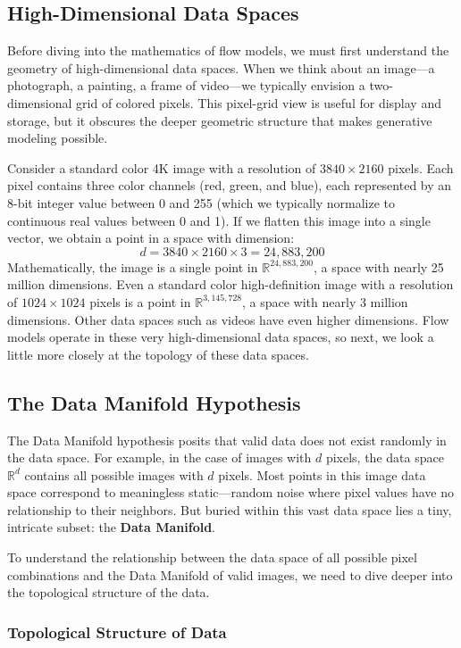 \documentclass{book}
\begin{document}
\subsection{High-Dimensional Data Spaces}
Before diving into the mathematics of flow models, we must first understand the geometry of high-dimensional data spaces. When we think about an image—a photograph, a painting, a frame of video—we typically envision a two-dimensional grid of colored pixels. This pixel-grid view is useful for display and storage, but it obscures the deeper geometric structure that makes generative modeling possible.

Consider a standard color 4K image with a resolution of $3840 \times 2160$ pixels. Each pixel contains three color channels (red, green, and blue), each represented by an 8-bit integer value between 0 and 255 (which we typically normalize to continuous real values between 0 and 1). If we flatten this image into a single vector, we obtain a point in a space with dimension:
\[
d = 3840 \times 2160 \times 3 = 24,883,200
\]
Mathematically, the image is a single point in $\mathbb{R}^{24,883,200}$, a space with nearly 25 million dimensions. Even a standard color high-definition image with a resolution of $1024 \times 1024$ pixels is a point in $\mathbb{R}^{3,145,728}$, a space with nearly 3 million dimensions. Other data spaces such as videos have even higher dimensions. Flow models operate in these very high-dimensional data spaces, so next, we look a little more closely at the topology of these data spaces.


\subsection{The Data Manifold Hypothesis}

The Data Manifold hypothesis posits that valid data does not exist randomly in the data space. For example, in the case of images with $d$ pixels, the data space $\mathbb{R}^d$  contains all possible images with $d$ pixels. Most points in this image data space correspond to meaningless static—random noise where pixel values have no relationship to their neighbors. But buried within this vast data space lies a tiny, intricate subset: the \textbf{Data Manifold}. 

To understand the relationship between the data space of all possible pixel combinations and the Data Manifold of valid images, we need to dive deeper into the topological structure of the data.

\subsubsection{Topological Structure of Data}
\end{document}
